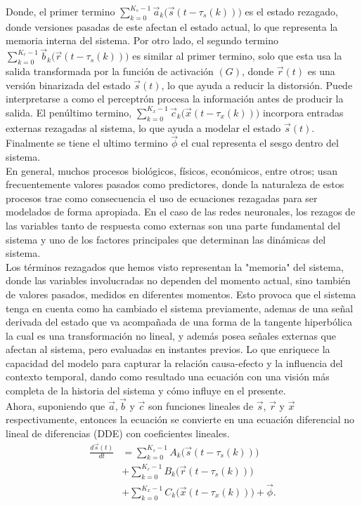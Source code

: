 \documentclass[12pt,letterpaper]{article}
\begin{document}
Donde, el primer termino $\sum_{k=0}^{K_s-1} \vec{a}_k \big( \vec{s}(t-\tau_s(k))  \big)$ es el estado rezagado, donde versiones pasadas de este afectan el estado actual, lo que representa la memoria interna del sistema. Por otro lado, el segundo termino $\sum_{k=0}^{K_r-1} \vec{b}_k \big( \vec{r}(t-\tau_s(k)) \big)$ es similar al primer termino, solo que esta usa la salida transformada por la función de activación $(G)$, donde $\vec{r}(t)$ es una versión binarizada del estado $\vec{s}(t)$, lo que ayuda a reducir la distorsión. Puede interpretarse a como el perceptrón procesa la información antes de producir la salida. El penúltimo termino, $\sum_{k=0}^{K_x-1} \vec{c}_k\big( \vec{x}(t-\tau_x(k))\big)$ incorpora entradas externas rezagadas al sistema, lo que ayuda a modelar el estado $\vec{s}(t)$. Finalmente se tiene el ultimo termino $\vec{\phi}$ el cual representa el sesgo dentro del sistema. \\

En general, muchos procesos biológicos, físicos, económicos, entre otros;
usan frecuentemente valores pasados como predictores, donde la naturaleza de estos procesos
trae como consecuencia el uso de ecuaciones rezagadas para ser modelados de forma apropiada.
En el caso de las redes neuronales, los rezagos de las variables tanto de respuesta como 
externas son una parte fundamental del sistema y uno de los factores principales que determinan las dinámicas del sistema. \\

Los términos rezagados que hemos visto representan la "memoria" del sistema, donde las 
variables involucradas no dependen del momento actual, sino también de valores pasados,
medidos en diferentes momentos. Esto provoca que el sistema tenga en cuenta como ha cambiado
el sistema previamente, ademas de una señal derivada del estado que va acompañada de una forma
de la tangente hiperbólica la cual es una transformación no lineal, y además posea señales 
externas que afectan al sistema, pero evaluadas en instantes previos.
Lo que enriquece la capacidad del modelo para capturar la relación causa-efecto y la influencia
del contexto temporal, dando como resultado una ecuación con una visión más completa de la historia
del sistema y cómo influye en el presente. \\

Ahora, suponiendo que $\vec{a}, \vec{b}$ y $\vec{c}$ son funciones lineales de $\vec{s}$, $\vec{r}$ y $\vec{x}$ respectivamente, entonces la ecuación se convierte en una ecuación diferencial no lineal de diferencias (DDE) con coeficientes lineales.
\begin{equation}
\begin{aligned}
    \frac{d\vec{s}(t)}{dt} &= \sum_{k=0}^{K_s-1} A_k \big( 
    \vec{s}(t-\tau_s(k))  \big)\\ 
    &+  \sum_{k=0}^{K_r-1} B_k \big( 
    \vec{r}(t-\tau_s(k)) \big)\\ 
    &+ \sum_{k=0}^{K_x-1} C_k\big( 
    \vec{x}(t-\tau_x(k))\big) + \vec{\phi}.
\end{aligned}
\end{equation}
\end{document}
